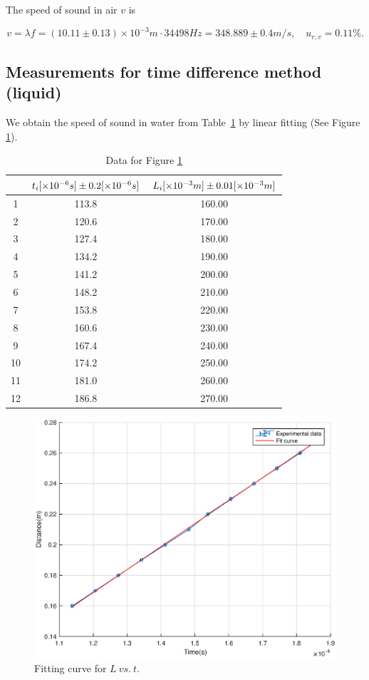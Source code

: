 The speed of sound in air $v$ is

\[
    v=\lambda f = (10.11 \pm 0.13) \times 10^{-3} m \cdot 34498 Hz  = 348.889
    \pm 0.4 m/s,\quad u_{r,v}=0.11\%. 
\]

\subsection{Measurements for time difference method (liquid)}

We obtain the speed of sound in water from Table~\ref{d3} by linear fitting (See Figure \ref{tl}).
    
\begin{table}[H] \small
    \centering
    \begin{tabular}{|c|c|c|}
    \hline
        & $t_i[\times 10^{-6}s] \pm 0.2 [\times 10^{-6} s]$  & $L_i[\times 10^{-3} m] \pm 0.01 [\times 10^{-3} m]$ \\\hline
        1  & 113.8 & 160.00 \\\hline
        2  & 120.6 & 170.00 \\\hline
        3  & 127.4 & 180.00 \\\hline
        4  & 134.2 & 190.00 \\\hline
        5  & 141.2 & 200.00 \\\hline
        6  & 148.2 & 210.00 \\\hline
        7  & 153.8 & 220.00 \\\hline
        8  & 160.6 & 230.00 \\\hline
        9  & 167.4 & 240.00 \\\hline
        10 & 174.2 & 250.00 \\\hline
        11 & 181.0 & 260.00 \\\hline
        12 & 186.8 & 270.00 \\\hline
    \end{tabular}
    \caption{Data for Figure \ref{tl}}
    \label{d3}
\end{table}

\begin{figure}[H]
    \centering
    \includegraphics[width=12cm]{fig/tl}
    \caption{Fitting curve for $L\ vs.\ t$. }\label{tl}
\end{figure}


